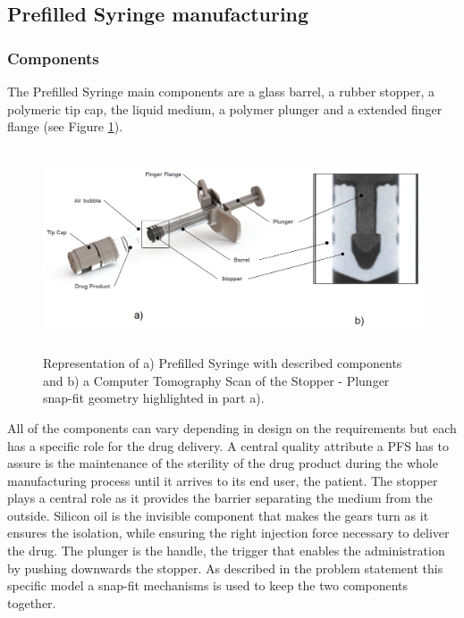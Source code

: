 \newpage
\subsection{Prefilled Syringe manufacturing}

\subsubsection{Components}
The Prefilled Syringe main components are a glass barrel, a rubber stopper, a polymeric tip cap, the liquid medium, a  polymer plunger and a extended finger flange (see Figure \ref{fgr:PFS}). 

\begin{figure}[h]	
	\centering
\includegraphics[height=6cm]{img/PFS.PNG}
   \caption{Representation of a) Prefilled  Syringe with described components and b) a Computer Tomography Scan of the Stopper - Plunger snap-fit geometry highlighted in part a).}
 \label{fgr:PFS}
\end{figure}

All of the components can vary depending in design on the requirements but each has a specific role for the drug delivery. A central quality attribute a PFS has to assure is the maintenance of the sterility of the drug product during the whole manufacturing process until it arrives to its end user, the patient. The stopper plays a central role as it provides the barrier separating the medium from the outside. Silicon oil is the invisible component that makes the gears turn as it ensures the isolation, while ensuring the right injection force necessary to deliver the drug. The plunger is the handle, the trigger that enables the administration by pushing downwards the stopper. As described in the problem statement this specific model a snap-fit mechanisms is used to keep the two components together. 

